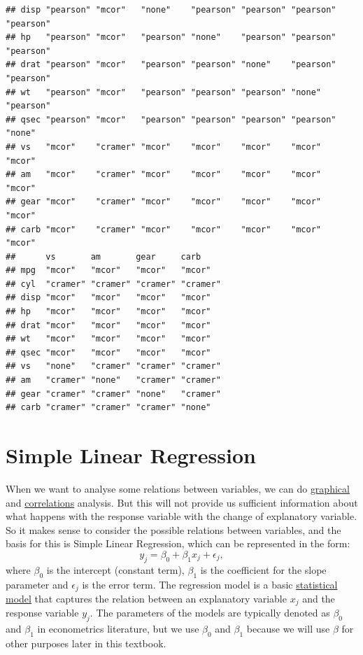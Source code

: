 \documentclass[
]{book}
\theoremstyle{definition}
\theoremstyle{definition}
\theoremstyle{definition}
\theoremstyle{definition}
\theoremstyle{remark}
\begin{document}
\begin{verbatim}
## disp "pearson" "mcor"   "none"    "pearson" "pearson" "pearson" "pearson"
## hp   "pearson" "mcor"   "pearson" "none"    "pearson" "pearson" "pearson"
## drat "pearson" "mcor"   "pearson" "pearson" "none"    "pearson" "pearson"
## wt   "pearson" "mcor"   "pearson" "pearson" "pearson" "none"    "pearson"
## qsec "pearson" "mcor"   "pearson" "pearson" "pearson" "pearson" "none"   
## vs   "mcor"    "cramer" "mcor"    "mcor"    "mcor"    "mcor"    "mcor"   
## am   "mcor"    "cramer" "mcor"    "mcor"    "mcor"    "mcor"    "mcor"   
## gear "mcor"    "cramer" "mcor"    "mcor"    "mcor"    "mcor"    "mcor"   
## carb "mcor"    "cramer" "mcor"    "mcor"    "mcor"    "mcor"    "mcor"   
##      vs       am       gear     carb    
## mpg  "mcor"   "mcor"   "mcor"   "mcor"  
## cyl  "cramer" "cramer" "cramer" "cramer"
## disp "mcor"   "mcor"   "mcor"   "mcor"  
## hp   "mcor"   "mcor"   "mcor"   "mcor"  
## drat "mcor"   "mcor"   "mcor"   "mcor"  
## wt   "mcor"   "mcor"   "mcor"   "mcor"  
## qsec "mcor"   "mcor"   "mcor"   "mcor"  
## vs   "none"   "cramer" "cramer" "cramer"
## am   "cramer" "none"   "cramer" "cramer"
## gear "cramer" "cramer" "none"   "cramer"
## carb "cramer" "cramer" "cramer" "none"
\end{verbatim}

\hypertarget{simpleLinearRegression}{%
\chapter{Simple Linear Regression}\label{simpleLinearRegression}}

When we want to analyse some relations between variables, we can do \protect\hyperlink{dataAnalysisGraphical}{graphical} and \protect\hyperlink{correlations}{correlations} analysis. But this will not provide us sufficient information about what happens with the response variable with the change of explanatory variable. So it makes sense to consider the possible relations between variables, and the basis for this is Simple Linear Regression, which can be represented in the form:
\begin{equation}
    y_j = \beta_0 + \beta_1 x_j + \epsilon_j ,
    \label{eq:SLRFormula}
\end{equation}
where \(\beta_0\) is the intercept (constant term), \(\beta_1\) is the coefficient for the slope parameter and \(\epsilon_j\) is the error term. The regression model is a basic \protect\hyperlink{modelsMethods}{statistical model} that captures the relation between an explanatory variable \(x_j\) and the response variable \(y_j\). The parameters of the models are typically denoted as \(\beta_0\) and \(\beta_1\) in econometrics literature, but we use \(\beta_0\) and \(\beta_1\) because we will use \(\beta\) for other purposes later in this textbook.
\end{document}
